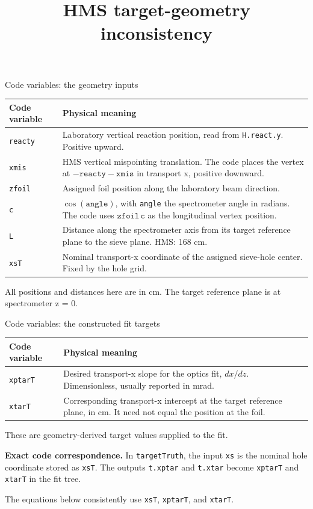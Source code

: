 \documentclass[aspectratio=169,11pt]{beamer}
\title{HMS target-geometry inconsistency}
\author{}
\date{}
\newcommand{\code}[1]{\texttt{#1}}
\newcommand{\cv}[1]{\mathtt{#1}}
\begin{document}
\begin{frame}{Code variables: the geometry inputs}
\small
\renewcommand{\arraystretch}{1.35}
\begin{tabular}{@{}p{}p{}@{}}
\toprule
Code variable & Physical meaning \\
\midrule
\code{reacty} & Laboratory vertical reaction position, read from \code{H.react.y}. Positive upward. \\
\code{xmis} & HMS vertical mispointing translation. The code places the vertex at \( -\cv{reacty}-\cv{xmis}\) in transport x, positive downward. \\
\code{zfoil} & Assigned foil position along the laboratory beam direction. \\
\code{c} & \(\cos(\cv{angle})\), with \code{angle} the spectrometer angle in radians. The code uses \(\cv{zfoil}\,\cv{c}\) as the longitudinal vertex position. \\
\code{L} & Distance along the spectrometer axis from its target reference plane to the sieve plane. HMS: 168 cm. \\
\code{xsT} & Nominal transport-x coordinate of the assigned sieve-hole center. Fixed by the hole grid. \\
\bottomrule
\end{tabular}
\vspace{2mm}

All positions and distances here are in cm. The target reference plane is at spectrometer z = 0.
\end{frame}

\begin{frame}{Code variables: the constructed fit targets}
\renewcommand{\arraystretch}{1.45}
\begin{tabular}{@{}p{}p{}@{}}
\toprule
Code variable & Physical meaning \\
\midrule
\code{xptarT} & Desired transport-x slope for the optics fit, \(dx/dz\). Dimensionless, usually reported in mrad. \\
\code{xtarT} & Corresponding transport-x intercept at the target reference plane, in cm. It need not equal the position at the foil. \\
\bottomrule
\end{tabular}
\vspace{4mm}

These are geometry-derived target values supplied to the fit.

\vspace{3mm}
\small
\textbf{Exact code correspondence.} In \code{targetTruth}, the input \code{xs} is the nominal hole coordinate stored as \code{xsT}. The outputs \code{t.xptar} and \code{t.xtar} become \code{xptarT} and \code{xtarT} in the fit tree.

\vspace{3mm}
The equations below consistently use \code{xsT}, \code{xptarT}, and \code{xtarT}.
\end{frame}
\end{document}
